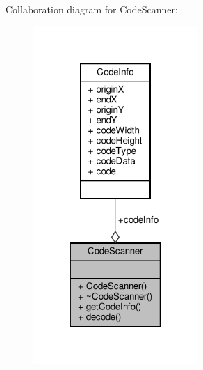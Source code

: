 Collaboration diagram for Code\+Scanner\+:\nopagebreak
\begin{figure}[H]
\begin{center}
\leavevmode
\includegraphics[width=177pt]{class_code_scanner__coll__graph}
\end{center}
\end{figure}

